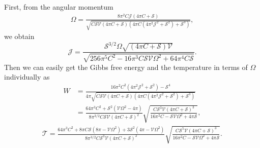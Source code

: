 \documentclass[a4paper,11pt]{article}
\def\T{\mathcal{T}} \def\O{\mathcal{O}} \def\S{\mathcal{S}}\def\J{\mathcal{J}}\def\V{\mathcal{V}}\def\Q{\mathcal{Q}}\def\F{\mathcal{F}}
\begin{document}
First, from the angular momentum
\begin{equation}
\begin{aligned}
\Omega=\frac{8 \pi ^2 C \mathcal{J} (4 \pi  C+\mathcal{S})}{\sqrt{C \mathcal{S} \mathcal{V} (4 \pi  C+\mathcal{S}) \left(4 \pi  C \left(4 \pi ^2 \mathcal{J}^2+\mathcal{S}^2\right)+\mathcal{S}^3\right)}},
\end{aligned}
\end{equation}
we obtain
\begin{equation}
\J=\frac{\mathcal{S}^{3/2} \Omega  \sqrt{(4 \pi  C+\mathcal{S})\V}}{\sqrt{256 \pi ^5 C^2-16 \pi ^3 C \mathcal{S} \mathcal{V} \Omega ^2+64 \pi ^4 C \mathcal{S}}}.
\end{equation}
Then we can easily get the Gibbs free energy and the temperature in terms of $\Omega$ individually as
\begin{equation}
\begin{aligned}
W&=\frac{16 \pi ^2 C^2 \left(4 \pi ^2 \mathcal{J}^2+\mathcal{S}^2\right)-\mathcal{S}^4}{4 \pi  \sqrt{C \mathcal{S} \mathcal{V} (4 \pi  C+\mathcal{S}) \left(4 \pi  C \left(4 \pi ^2 \mathcal{J}^2+\mathcal{S}^2\right)+\mathcal{S}^3\right)}}\\&=\frac{64 \pi ^3 C^2+\mathcal{S}^2 \left(\mathcal{V} \Omega ^2-4 \pi \right)}{8 \pi ^{3/2} C \mathcal{S} \mathcal{V} (4 \pi  C+\mathcal{S})^2}\sqrt{\frac{C \mathcal{S}^3 \mathcal{V} (4 \pi  C+\mathcal{S})^3}{16 \pi ^2 C-\mathcal{S} \mathcal{V} \Omega ^2+4 \pi  \mathcal{S}}},
\end{aligned}
\end{equation}
\begin{equation}
\begin{aligned}
\T =\frac{64 \pi ^3 C^2+8 \pi  C \mathcal{S} \left(8 \pi -\mathcal{V} \Omega ^2\right)+3 \mathcal{S}^2 \left(4 \pi -\mathcal{V} \Omega ^2\right)}{8 \pi ^{3/2} C \mathcal{S}^3 \mathcal{V} (4 \pi  C+\mathcal{S})^2}\sqrt{\frac{C \mathcal{S}^5 \mathcal{V} (4 \pi  C+\mathcal{S})^3}{16 \pi ^2 C-\mathcal{S} \mathcal{V} \Omega ^2+4 \pi  \mathcal{S}}}.
\end{aligned}
\end{equation}
\end{document}
